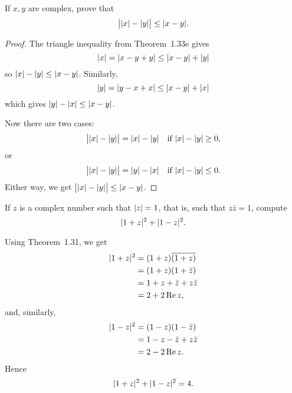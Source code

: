  If $x, y$ are complex, prove that
\begin{equation*}
  \big\lvert\lvert{x}\rvert - \lvert{y}\rvert\big\rvert \leq \lvert{x - y}\rvert.
\end{equation*}
\begin{proof}
  The triangle inequality from Theorem~1.33e gives
  \begin{equation*}
    \lvert{x}\rvert = \lvert{x - y + y}\rvert \leq \lvert{x - y}\rvert + \lvert{y}\rvert
  \end{equation*}
  so $\lvert{x}\rvert - \lvert{y}\rvert \leq \lvert{x - y}\rvert$. Similarly,
  \begin{equation*}
    \lvert{y}\rvert = \lvert{y - x + x}\rvert \leq \lvert{x - y}\rvert + \lvert{x}\rvert
  \end{equation*}
  which gives $\lvert{y}\rvert - \lvert{x}\rvert \leq \lvert{x - y}\rvert$.

  Now there are two cases:
  \begin{align*}
    \big\lvert\lvert{x}\rvert - \lvert{y}\rvert\big\rvert = \lvert{x}\rvert - \lvert{y}\rvert
    \quad\text{if $\lvert{x}\rvert - \lvert{y}\rvert \geq 0$,}
  \end{align*}
  or
  \begin{align*}
    \big\lvert\lvert{x}\rvert - \lvert{y}\rvert\big\rvert = \lvert{y}\rvert - \lvert{x}\rvert
    \quad\text{if $\lvert{x}\rvert - \lvert{y}\rvert \leq 0$.}
  \end{align*}
  Either way, we get
  $\big\lvert\lvert{x}\rvert - \lvert{y}\rvert\big\rvert \leq \lvert{x - y}\rvert$.
\end{proof}

 If $z$ is a complex number such that $\lvert{z}\rvert = 1$, that
is, such that $z\bar{z} = 1$, compute
\begin{equation*}
  \lvert{1 + z}\rvert^2 + \lvert{1 - z}\rvert^2.
\end{equation*}
\begin{solution}
  Using Theorem~1.31, we get
  \begin{align*}
    \lvert{1 + z}\rvert^2 &= (1 + z)\overline{(1 + z)} \\
                  &= (1 + z)(1 + \bar{z}) \\
                  &= 1 + z + \bar{z} + z\bar{z} \\
                  &= 2 + 2\operatorname{Re} z,
  \end{align*}
  and, similarly,
  \begin{align*}
    \lvert{1 - z}\rvert^2 &= (1 - z)(1 - \bar{z}) \\
                  &= 1 - z - \bar{z} + z\bar{z} \\
                  &= 2 - 2\operatorname{Re} z.
  \end{align*}
  Hence
  \begin{equation*}
    \lvert{1 + z}\rvert^2 + \lvert{1 - z}\rvert^2 = 4. \qedhere
  \end{equation*}
\end{solution}


